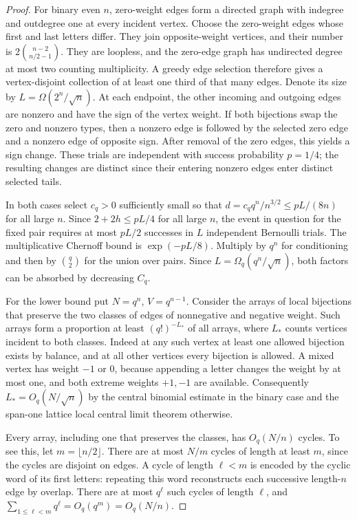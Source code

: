 \documentclass[11pt]{article}
\begin{document}
\begin{proof}
For binary even \(n\), zero-weight edges form a directed graph
with indegree and outdegree one at every incident vertex.
Choose the zero-weight edges whose first and last letters differ.
They join opposite-weight vertices, and their number is
\(2\binom{n-2}{n/2-1}\). They are loopless, and the zero-edge
graph has undirected degree at most two counting multiplicity.
A greedy edge selection therefore gives a vertex-disjoint
collection of at least one third of that many edges. Denote its
size by \(L=\Omega(2^n/\sqrt n)\). At each endpoint, the other
incoming and outgoing edges are nonzero and have the sign of
the vertex weight. If both bijections swap the zero and
nonzero types, then a nonzero edge is followed by the selected
zero edge and a nonzero edge of opposite sign. After removal
of the zero edges, this yields a sign change. These trials
are independent with success probability \(p=1/4\);
the resulting changes are distinct since their entering nonzero
edges enter distinct selected tails.

In both cases select \(c_q>0\) sufficiently small so that
\(d=c_q q^n/n^{3/2}\le pL/(8n)\) for all large \(n\).
Since \(2+2h\le pL/4\) for all large \(n\), the event in
question for the fixed pair requires at most \(pL/2\) successes
in \(L\) independent Bernoulli trials. The multiplicative
Chernoff bound is \(\exp(-pL/8)\). Multiply by \(q^n\) for
conditioning and then by \(\binom q2\) for the union over pairs.
Since \(L=\Omega_q(q^n/\sqrt n)\), both factors can be absorbed
by decreasing \(C_q\).

For the lower bound put \(N=q^n\), \(V=q^{n-1}\).
Consider the arrays of local bijections that preserve the two
classes of edges of nonnegative and negative weight.
Such arrays form a proportion at least \((q!)^{-L_*}\) of all
arrays, where \(L_*\) counts vertices incident to both classes.
Indeed at any such vertex at least one allowed bijection exists
by balance, and at all other vertices every bijection is allowed.
A mixed vertex has weight \(-1\) or \(0\), because appending a
letter changes the weight by at most one, and both extreme
weights \(+1,-1\) are available. Consequently
\(L_*=O_q(N/\sqrt n)\) by the central binomial estimate in the
binary case and the span-one lattice local central limit theorem
otherwise.

Every array, including one that preserves the classes, has
\(O_q(N/n)\) cycles. To see this, let \(m=\lfloor n/2\rfloor\).
There are at most \(N/m\) cycles of length at least \(m\), since
the cycles are disjoint on edges. A cycle of length \(\ell<m\)
is encoded by the cyclic word of its first letters: repeating
this word reconstructs each successive length-\(n\) edge by overlap.
There are at most \(q^\ell\) such cycles of length \(\ell\), and
\(\sum_{1\le\ell<m}q^\ell=O_q(q^m)=O_q(N/n)\).


\end{proof}
\end{document}
